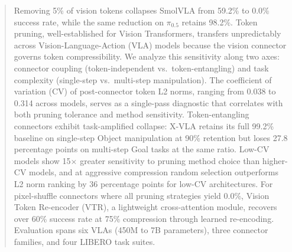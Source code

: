 \begin{abstract}
Removing 5\% of vision tokens collapses SmolVLA from 59.2\% to 0.0\% success rate, while the same reduction on $\pi_0.5$ retains 98.2\%. Token pruning, well-established for Vision Transformers, transfers unpredictably across Vision-Language-Action (VLA) models because the vision connector governs token compressibility. We analyze this sensitivity along two axes: connector coupling (token-independent vs.\ token-entangling) and task complexity (single-step vs.\ multi-step manipulation). The coefficient of variation (CV) of post-connector token L2 norms, ranging from 0.038 to 0.314 across models, serves as a single-pass diagnostic that correlates with both pruning tolerance and method sensitivity. Token-entangling connectors exhibit task-amplified collapse: X-VLA retains its full 99.2\% baseline on single-step Object manipulation at 90\% retention but loses 27.8 percentage points on multi-step Goal tasks at the same ratio. Low-CV models show 15$\times$ greater sensitivity to pruning method choice than higher-CV models, and at aggressive compression random selection outperforms L2 norm ranking by 36 percentage points for low-CV architectures. For pixel-shuffle connectors where all pruning strategies yield 0.0\%, Vision Token Re-encoder (VTR), a lightweight cross-attention module, recovers over 60\% success rate at 75\% compression through learned re-encoding. Evaluation spans six VLAs (450M to 7B parameters), three connector families, and four LIBERO task suites.
\end{abstract}
